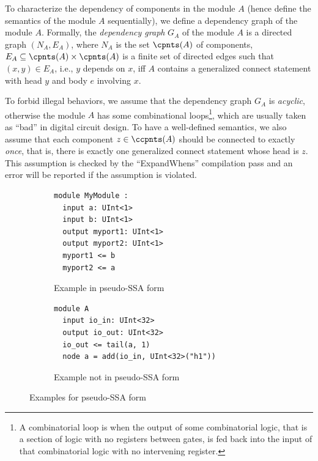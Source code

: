To characterize the dependency of components in the module $A$ (hence define the semantics of the module $A$ sequentially), we define a dependency graph of the module $A$.
Formally, the \emph{dependency graph} $G_A$ of the module $A$ is a directed graph $(N_A, E_A)$, where $N_A$ is the set $\cpnts(A)$ of components,
$E_A\subseteq \cpnts(A)\times \cpnts(A)$ is a finite set of directed edges such that
$(x, y)\in E_A$, i.e., $y$ depends on $x$, iff $A$ contains a generalized connect statement with head $y$ and body $e$ involving $x$.
%

To forbid illegal behaviors, we assume that the dependency graph $G_A$ is \emph{acyclic},
otherwise the module $A$ has some combinational loops\footnote{A combinatorial loop is when the output of some combinatorial logic, that is a section of logic with no registers between gates, is fed back into the input of that combinatorial logic with no intervening register.}, which are usually taken as ``bad'' in digital circuit design.
To have a well-defined semantics, we also assume that each component $z \in \ccpnts(A)$ should be connected to exactly \emph{once}, that is,
there is exactly one generalized connect statement whose head is $z$. This assumption
is checked by the ``ExpandWhens'' compilation pass and an error will be reported if the assumption
is violated. 


\begin{figure}[!t]
\centering
\begin{subfigure}[b]{0.4\textwidth}
         \centering
\begin{lstlisting}
module MyModule :
  input a: UInt<1>
  input b: UInt<1>
  output myport1: UInt<1>
  output myport2: UInt<1>
  myport1 <= b
  myport2 <= a
\end{lstlisting}
\caption{Example in pseudo-SSA form}
\label{fig:exampleinSSA}
\end{subfigure}
\hspace{4mm}
\begin{subfigure}[b]{0.45\textwidth}
         \centering
\begin{lstlisting}
module A
  input io_in: UInt<32>
  output io_out: UInt<32>
  io_out <= tail(a, 1)
  node a = add(io_in, UInt<32>("h1"))
\end{lstlisting}
\caption{Example not in pseudo-SSA form}
\label{fig:examplenotinSSA}
\end{subfigure}
\caption{Examples for pseudo-SSA form}
\end{figure}



